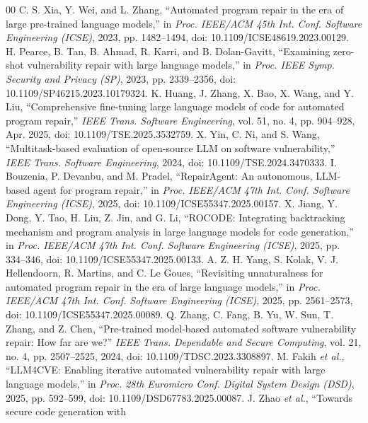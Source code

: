 \documentclass[conference]{IEEEtran}
\begin{document}
\begin{thebibliography}{00}
 C. S. Xia, Y. Wei, and L. Zhang, ``Automated program repair in the
era of large pre-trained language models,'' in \textit{Proc. IEEE/ACM 45th Int. Conf.
Software Engineering (ICSE)}, 2023, pp. 1482--1494, doi: 10.1109/ICSE48619.2023.00129.
 H. Pearce, B. Tan, B. Ahmad, R. Karri, and B. Dolan-Gavitt,
``Examining zero-shot vulnerability repair with large language models,'' in \textit{Proc.
IEEE Symp. Security and Privacy (SP)}, 2023, pp. 2339--2356, doi:
10.1109/SP46215.2023.10179324.
 K. Huang, J. Zhang, X. Bao, X. Wang, and Y. Liu,
``Comprehensive fine-tuning large language models of code for automated program
repair,'' \textit{IEEE Trans. Software Engineering}, vol. 51, no. 4, pp. 904--928, Apr.
2025, doi: 10.1109/TSE.2025.3532759.
 X. Yin, C. Ni, and S. Wang, ``Multitask-based evaluation of
open-source LLM on software vulnerability,'' \textit{IEEE Trans. Software Engineering},
2024, doi: 10.1109/TSE.2024.3470333.
 I. Bouzenia, P. Devanbu, and M. Pradel, ``RepairAgent:
An autonomous, LLM-based agent for program repair,'' in \textit{Proc. IEEE/ACM 47th Int.
Conf. Software Engineering (ICSE)}, 2025, doi: 10.1109/ICSE55347.2025.00157.
 X. Jiang, Y. Dong, Y. Tao, H. Liu, Z. Jin, and G. Li, ``ROCODE:
Integrating backtracking mechanism and program analysis in large language models for code
generation,'' in \textit{Proc. IEEE/ACM 47th Int. Conf. Software Engineering (ICSE)},
2025, pp. 334--346, doi: 10.1109/ICSE55347.2025.00133.
 A. Z. H. Yang, S. Kolak, V. J. Hellendoorn, R. Martins, and
C. Le Goues, ``Revisiting unnaturalness for automated program repair in the era of large
language models,'' in \textit{Proc. IEEE/ACM 47th Int. Conf. Software Engineering
(ICSE)}, 2025, pp. 2561--2573, doi: 10.1109/ICSE55347.2025.00089.
 Q. Zhang, C. Fang, B. Yu, W. Sun, T. Zhang, and Z. Chen,
``Pre-trained model-based automated software vulnerability repair: How far are we?''
\textit{IEEE Trans. Dependable and Secure Computing}, vol. 21, no. 4, pp. 2507--2525,
2024, doi: 10.1109/TDSC.2023.3308897.
 M. Fakih \textit{et al.}, ``LLM4CVE: Enabling iterative
automated vulnerability repair with large language models,'' in \textit{Proc. 28th
Euromicro Conf. Digital System Design (DSD)}, 2025, pp. 592--599, doi:
10.1109/DSD67783.2025.00087.
 J. Zhao \textit{et al.}, ``Towards secure code generation with

\end{thebibliography}
\end{document}
